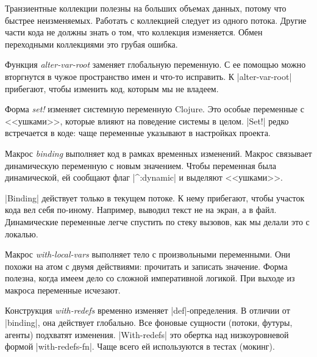 Транзиентные коллекции полезны на больших объемах данных, потому что быстрее
неизменяемых. Работать с коллекцией следует из одного потока. Другие части кода
не должны знать о том, что коллекция изменяется. Обмен переходными коллекциями
это грубая ошибка.

Функция \emph{alter-var-root} заменяет глобальную переменную. С ее помощью можно
вторгнутся в чужое пространство имен и что-то исправить. К \spverb|alter-var-root|
прибегают, чтобы изменить код, которым мы не владеем.

Форма \emph{set!} изменяет системную переменную Clojure. Это особые переменные с
<<ушками>>, которые влияют на поведение системы в целом. \spverb|Set!| редко
встречается в коде: чаще переменные указывают в настройках проекта.

Макрос \emph{binding} выполняет код в рамках временных изменений. Макрос
связывает динамическую переменную с новым значением. Чтобы переменная была
динамической, ей сообщают флаг \spverb|^:dynamic| и выделяют <<ушками>>.

\spverb|Binding| действует только в текущем потоке. К нему прибегают, чтобы
участок кода вел себя по-иному. Например, выводил текст не на экран, а в
файл. Динамические переменные легче спустить по стеку вызовов, как мы делали это
с локалью.

Макрос \emph{with-local-vars} выполняет тело с произвольными переменными. Они
похожи на атом с двумя действиями: прочитать и записать значение. Форма полезна,
когда имеем дело со сложной императивной логикой. При выходе из макроса
переменные исчезают.

Конструкция \emph{with-redefs} временно изменяет \spverb|def|-определения. В
отличии от \spverb|binding|, она действует глобально. Все фоновые сущности
(потоки, футуры, агенты) подхватят изменения. \spverb|With-redefs| это обертка
над низкоуровневой формой \spverb|with-redefs-fn|. Чаще всего ей используются в
тестах (мокинг).
